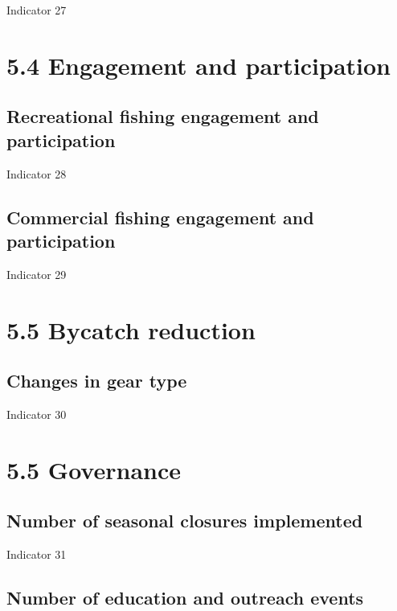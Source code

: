 \documentclass[
  letterpaper,
  oneside,
  open=any]{scrbook}
\begin{document}
Indicator 27

\hypertarget{engagement-and-participation}{%
\section{5.4 Engagement and
participation}\label{engagement-and-participation}}

\hypertarget{recreational-fishing-engagement-and-participation}{%
\subsection{Recreational fishing engagement and
participation}\label{recreational-fishing-engagement-and-participation}}

Indicator 28

\hypertarget{commercial-fishing-engagement-and-participation}{%
\subsection{Commercial fishing engagement and
participation}\label{commercial-fishing-engagement-and-participation}}

Indicator 29

\hypertarget{bycatch-reduction}{%
\section{5.5 Bycatch reduction}\label{bycatch-reduction}}

\hypertarget{changes-in-gear-type}{%
\subsection{Changes in gear type}\label{changes-in-gear-type}}

Indicator 30

\hypertarget{governance}{%
\section{5.5 Governance}\label{governance}}

\hypertarget{number-of-seasonal-closures-implemented}{%
\subsection{Number of seasonal closures
implemented}\label{number-of-seasonal-closures-implemented}}

Indicator 31

\hypertarget{number-of-education-and-outreach-events}{%
\subsection{Number of education and outreach
events}\label{number-of-education-and-outreach-events}}
\end{document}
